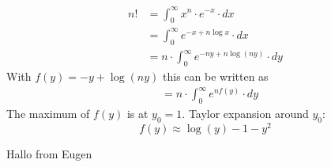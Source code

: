 \begin{align}
    n!
    &=\int_0^\infty x^n\cdot e^{-x}\cdot dx \\
    &=\int_0^\infty e^{-x+n\log x}\cdot dx \\
    &=n\cdot\int_0^\infty e^{-ny+n\log(ny)}\cdot dy
\end{align}
With $f(y)=-y+\log(ny)$ this can be written as
\begin{align}
    &=n\cdot\int_0^\infty e^{nf(y)}\cdot dy
\end{align}
The maximum of $f(y)$ is at $y_0=1$. Taylor expansion 
around $y_0$:
\begin{equation}
    f(y)\approx\log(y)-1-y^2
\end{equation}

Hallo from Eugen